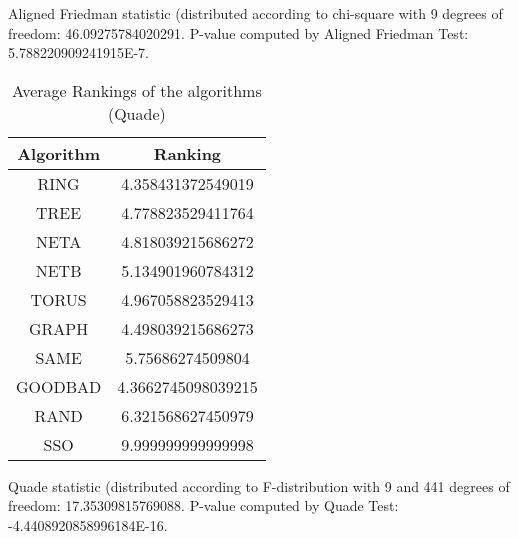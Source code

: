 \documentclass[a4paper,10pt]{article}
\begin{document}
\begin{landscape}
Aligned Friedman statistic (distributed according to chi-square with 9 degrees of freedom: 46.09275784020291. 
P-value computed by Aligned Friedman Test: 5.788220909241915E-7.\newline


\newpage

\begin{table}[!htp]
\centering
\caption{Average Rankings of the algorithms (Quade)
}\begin{tabular}{c|c}
Algorithm&Ranking\\
\hline
 RING&4.358431372549019\\
 TREE&4.778823529411764\\
 NETA&4.818039215686272\\
 NETB&5.134901960784312\\
 TORUS&4.967058823529413\\
 GRAPH&4.498039215686273\\
 SAME&5.75686274509804\\
 GOODBAD&4.3662745098039215\\
 RAND&6.321568627450979\\
 SSO&9.999999999999998\\
\end{tabular}
\end{table}
Quade statistic (distributed according to F-distribution with 9 and 441 degrees of freedom: 17.35309815769088. 
P-value computed by Quade Test: -4.4408920858996184E-16.\newline


\newpage


\end{landscape}
\end{document}

